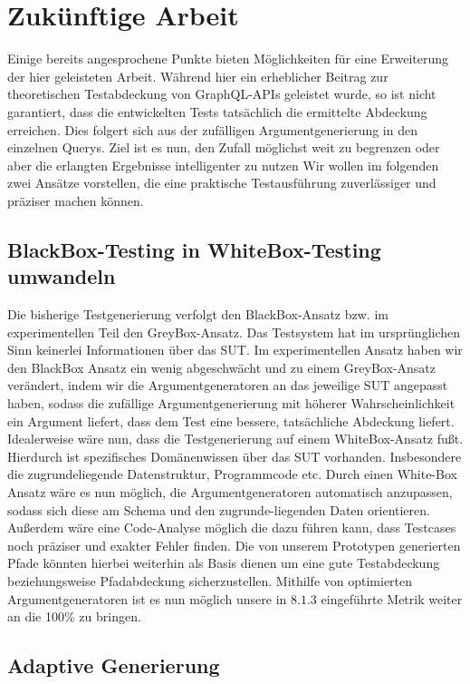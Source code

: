 \chapter{Zukünftige Arbeit}
\label{futurework}

Einige bereits angesprochene Punkte bieten Möglichkeiten für eine Erweiterung der hier geleisteten Arbeit.
Während hier ein erheblicher Beitrag zur theoretischen Testabdeckung von GraphQL-APIs geleistet wurde,
so ist nicht garantiert, dass die entwickelten Tests tatsächlich die ermittelte Abdeckung erreichen.
Dies folgert sich aus der zufälligen Argumentgenerierung in den einzelnen Querys.
Ziel ist es nun, den Zufall möglichst weit zu begrenzen oder aber die erlangten Ergebnisse intelligenter zu nutzen
Wir wollen im folgenden zwei Ansätze vorstellen, die eine praktische Testausführung zuverlässiger und
präziser machen können.

\section{BlackBox-Testing in WhiteBox-Testing umwandeln}

Die bisherige Testgenerierung verfolgt den BlackBox-Ansatz bzw. im experimentellen Teil den GreyBox-Ansatz.
Das Testsystem hat im ursprünglichen Sinn keinerlei Informationen über das SUT.
Im experimentellen Ansatz haben wir den BlackBox Ansatz ein wenig abgeschwächt und zu einem GreyBox-Ansatz verändert, indem wir
die Argumentgeneratoren an das jeweilige SUT angepasst haben, sodass die zufällige Argumentgenerierung mit höherer Wahrscheinlichkeit
ein Argument liefert, dass dem Test eine bessere, tatsächliche Abdeckung liefert.
Idealerweise wäre nun, dass die Testgenerierung auf einem WhiteBox-Ansatz fußt.
Hierdurch ist spezifisches Domänenwissen über das SUT vorhanden.
Insbesondere die zugrundeliegende Datenstruktur, Programmcode etc.
Durch einen White-Box Ansatz wäre es nun möglich, die Argumentgeneratoren automatisch anzupassen, sodass sich diese
am Schema und den zugrunde-liegenden Daten orientieren.
Außerdem wäre eine Code-Analyse möglich die dazu führen kann, dass Testcases noch präziser und exakter Fehler finden.
Die von unserem Prototypen generierten Pfade könnten hierbei weiterhin als Basis dienen um eine gute Testabdeckung beziehungsweise Pfadabdeckung sicherzustellen.
Mithilfe von optimierten Argumentgeneratoren ist es nun möglich unsere in $8.1.3$ eingeführte Metrik weiter an die 100\% zu bringen.

\section{Adaptive Generierung}

